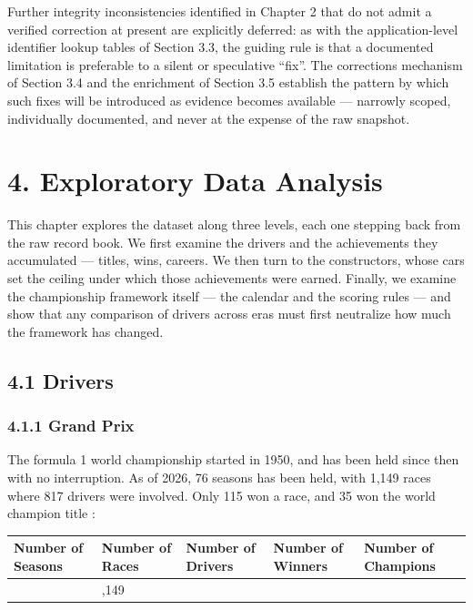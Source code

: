 \documentclass[
]{article}
\begin{document}
Further integrity inconsistencies identified in Chapter 2 that do not
admit a verified correction at present are explicitly deferred: as with
the application-level identifier lookup tables of Section 3.3, the
guiding rule is that a documented limitation is preferable to a silent
or speculative ``fix''. The corrections mechanism of Section 3.4 and the
enrichment of Section 3.5 establish the pattern by which such fixes will
be introduced as evidence becomes available --- narrowly scoped,
individually documented, and never at the expense of the raw snapshot.

\newpage

\section{4. Exploratory Data Analysis}\label{exploratory-data-analysis}

This chapter explores the dataset along three levels, each one stepping
back from the raw record book. We first examine the drivers and the
achievements they accumulated --- titles, wins, careers. We then turn to
the constructors, whose cars set the ceiling under which those
achievements were earned. Finally, we examine the championship framework
itself --- the calendar and the scoring rules --- and show that any
comparison of drivers across eras must first neutralize how much the
framework has changed.

\subsection{4.1 Drivers}\label{drivers}

\subsubsection{4.1.1 Grand Prix}\label{grand-prix}

The formula 1 world championship started in 1950, and has been held
since then with no interruption. As of 2026, 76 seasons has been held,
with 1,149 races where 817 drivers were involved. Only 115 won a race,
and 35 won the world champion title :

\begin{table}[!h]
\centering\begingroup\fontsize{9}{11}\selectfont

\begin{tabular}[t]{>{\raggedleft\arraybackslash}p{2cm}>{\raggedleft\arraybackslash}p{2cm}>{\raggedleft\arraybackslash}p{2cm}>{\raggedleft\arraybackslash}p{2cm}>{\raggedleft\arraybackslash}p{2cm}}
\toprule
Number of Seasons & Number of Races & Number of Drivers & Number of Winners & Number of Champions\\
\midrule
76 & 1,149 & 817 & 115 & 35\\
\bottomrule
\end{tabular}
\endgroup{}
\end{table}
\end{document}
